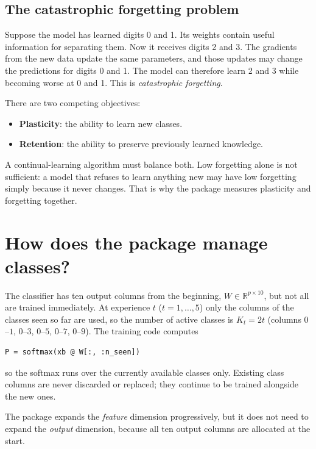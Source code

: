 \documentclass[11pt,a4paper]{article}
\newcommand{\R}{\mathbb{R}}
\begin{document}
\subsection{The catastrophic forgetting problem}

Suppose the model has learned digits 0 and 1. Its weights contain useful information for separating them. Now it receives digits 2 and 3. The gradients from the new data update the same parameters, and those updates may change the predictions for digits 0 and 1. The model can therefore learn 2 and 3 while becoming worse at 0 and 1. This is \emph{catastrophic forgetting}.

There are two competing objectives:
\begin{itemize}
\item \textbf{Plasticity}: the ability to learn new classes.
\item \textbf{Retention}: the ability to preserve previously learned knowledge.
\end{itemize}
A continual-learning algorithm must balance both. Low forgetting alone is not sufficient: a model that refuses to learn anything new may have low forgetting simply because it never changes. That is why the package measures plasticity and forgetting together.

\section{How does the package manage classes?}

The classifier has ten output columns from the beginning, $W\in\R^{p\times10}$, but not all are trained immediately. At experience $t$ ($t=1,\ldots,5$) only the columns of the classes seen so far are used, so the number of active classes is $K_t=2t$ (columns $0$--$1$, $0$--$3$, $0$--$5$, $0$--$7$, $0$--$9$). The training code computes
\begin{lstlisting}
P = softmax(xb @ W[:, :n_seen])
\end{lstlisting}
so the softmax runs over the currently available classes only. Existing class columns are never discarded or replaced; they continue to be trained alongside the new ones.

\begin{keybox}
The package expands the \emph{feature} dimension progressively, but it does not need to expand the \emph{output} dimension, because all ten output columns are allocated at the start.
\end{keybox}
\end{document}
